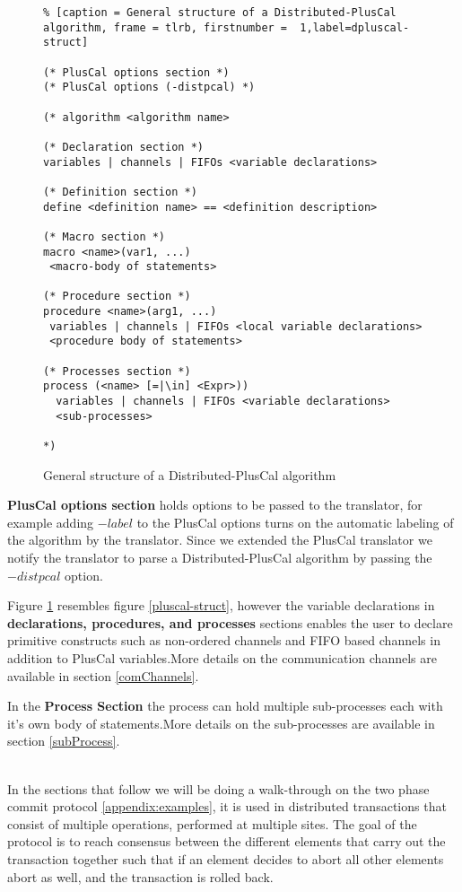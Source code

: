 \documentclass{thesul}
\begin{document}
\begin{figure}
\begin{lstlisting}% [caption = General structure of a Distributed-PlusCal algorithm, frame = tlrb, firstnumber =  1,label=dpluscal-struct]

(* PlusCal options section *)
(* PlusCal options (-distpcal) *)

(* algorithm <algorithm name>

(* Declaration section *)
variables | channels | FIFOs <variable declarations>

(* Definition section *)
define <definition name> == <definition description>

(* Macro section *)
macro <name>(var1, ...)
 <macro-body of statements>

(* Procedure section *)
procedure <name>(arg1, ...)
 variables | channels | FIFOs <local variable declarations>
 <procedure body of statements>

(* Processes section *)
process (<name> [=|\in] <Expr>))
  variables | channels | FIFOs <variable declarations>
  <sub-processes>

*)

\end{lstlisting}
\caption{General structure of a Distributed-PlusCal algorithm}
\label{dpluscal-struct}
\end{figure}

\textbf{PlusCal options section} holds options to be passed to the translator, for example adding $-label$ to the PlusCal options turns on the automatic labeling of the algorithm by the translator. Since we extended the PlusCal translator we notify the translator to parse a Distributed-PlusCal algorithm by passing the $-distpcal$ option.

Figure \ref{dpluscal-struct} resembles figure \ref{pluscal-struct}, however the variable declarations in \textbf{declarations, procedures, and processes} sections enables the user to declare primitive constructs such as non-ordered channels and FIFO based channels in addition to PlusCal variables.More details on the communication channels are available in section \ref{comChannels}.

In the \textbf{Process Section} the process can hold multiple sub-processes each with it's own body of statements.More details on the sub-processes are available in section \ref{subProcess}.


\hfill\\
In the sections that follow we will be doing a walk-through on the two phase commit protocol \ref{appendix:examples}, it is used in distributed transactions that consist of multiple operations, performed at multiple sites. The goal of the protocol is to reach consensus between the different elements that carry out the transaction together such that if an element decides to abort all other elements abort as well, and the transaction is rolled back.
\end{document}
